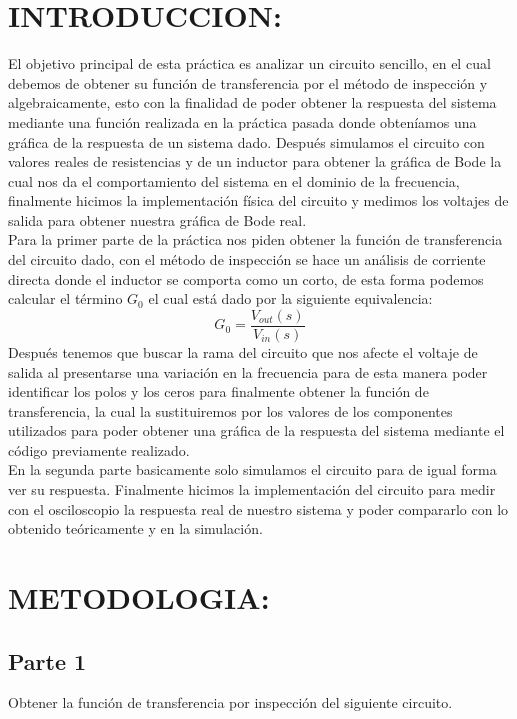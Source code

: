 \documentclass[letterpaper,10pt]{article}
\begin{document}
	\section{INTRODUCCION:} El objetivo principal de esta práctica es analizar un circuito sencillo, en el cual debemos de obtener su función de transferencia por el método de inspección y algebraicamente, esto con la finalidad de poder obtener la respuesta del sistema mediante una función realizada en la práctica pasada donde obteníamos una gráfica de la respuesta de un sistema dado. Después simulamos el circuito con valores reales de resistencias y de un inductor para obtener la gráfica de Bode la cual nos da el comportamiento del sistema en el dominio de la frecuencia, finalmente hicimos la implementación física del circuito y medimos los voltajes de salida para obtener nuestra gráfica de Bode real. \\
	
	Para la primer parte de la práctica nos piden obtener la función de transferencia del circuito dado, con el método de inspección se hace un análisis de corriente directa donde el inductor se comporta como un corto, de esta forma podemos calcular el término $G_{0}$ el cual está dado por la siguiente equivalencia:
	\[G_{0}=\frac{V_{out}(s)}{V_{in}(s)}\]
	Después tenemos que buscar la rama del circuito que nos afecte el voltaje de salida al presentarse una variación en la frecuencia para de esta manera poder identificar los polos y los ceros para finalmente obtener la función de transferencia, la cual la sustituiremos por los valores de los componentes utilizados para poder obtener una gráfica de la respuesta del sistema mediante el código previamente realizado.\\
	
	En la segunda parte basicamente solo simulamos el circuito para de igual forma ver su respuesta. Finalmente hicimos la implementación del circuito para medir con el osciloscopio la respuesta real de nuestro sistema y poder compararlo con lo obtenido teóricamente y en la simulación.\\
	\section{METODOLOGIA:}
	\subsection{Parte 1} 
	\textbullet Obtener la función de transferencia por inspección del siguiente circuito.\\
	
\end{document}
